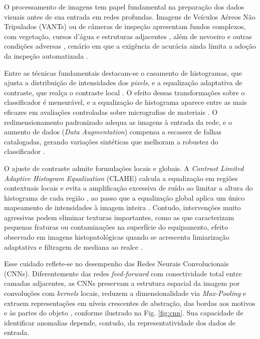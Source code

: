 \documentclass[conference]{IEEEtran}
\begin{document}
O processamento de imagens tem papel fundamental na preparação dos dados visuais antes de sua entrada em redes profundas. Imagens de Veículos Aéreos Não Tripulados (VANTs) ou de câmeras de inspeção apresentam fundos complexos, com vegetação, cursos d'água e estruturas adjacentes \cite{liu2021}, além de nevoeiro e outras condições adversas \cite{wang2023}, cenário em que a exigência de acurácia ainda limita a adoção da inspeção automatizada \cite{nguyen2018automatic}.

Entre as técnicas fundamentais destacam-se o casamento de histogramas, que ajusta a distribuição de intensidades dos \textit{pixels}, e a equalização adaptativa de contraste, que realça o contraste local \cite{archana2024deep}. O efeito dessas transformações sobre o classificador é mensurável, e a equalização de histograma aparece entre as mais eficazes em avaliações controladas sobre micrografias de materiais \cite{pei2023robustness}. O redimensionamento padronizado adequa as imagens à entrada da rede, e o aumento de dados (\textit{Data Augmentation}) compensa a escassez de falhas catalogadas, gerando variações sintéticas que melhoram a robustez do classificador \cite{shorten2019survey}.

O ajuste de contraste admite formulações locais e globais. A \textit{Contrast Limited Adaptive Histogram Equalization} (CLAHE) calcula a equalização em regiões contextuais locais e evita a amplificação excessiva de ruído ao limitar a altura do histograma de cada região \cite{pizer1987adaptive}, ao passo que a equalização global aplica um único mapeamento de intensidades à imagem inteira \cite{Gonzalez2008}. Contudo, intervenções muito agressivas podem eliminar texturas importantes, como as que caracterizam pequenas fraturas ou contaminações na superfície do equipamento, efeito observado em imagens histopatológicas quando se acrescenta limiarização adaptativa e filtragem de mediana ao realce \cite{ozturk2018histopathological}.

Esse cuidado reflete-se no desempenho das Redes Neurais Convolucionais (CNNs). Diferentemente das redes \textit{feed-forward} com conectividade total entre camadas adjacentes, as CNNs preservam a estrutura espacial da imagem por convoluções com \textit{kernels} locais, reduzem a dimensionalidade via \textit{Max-Pooling} e extraem representações em níveis crescentes de abstração, das bordas aos motivos e às partes do objeto \cite{LeCun2015}, conforme ilustrado na Fig. \ref{fig:cnn}. Sua capacidade de identificar anomalias depende, contudo, da representatividade dos dados de entrada.
\end{document}
